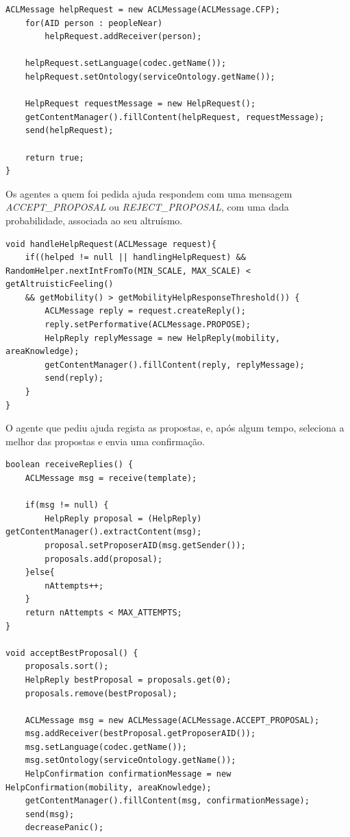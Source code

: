 \documentclass[12pt]{article}
\begin{document}
\begin{titlepage}
\begin{itemize}
\begin{lstlisting}[caption= Código \textit{Java}\ de envio de um pedido de ajuda.]
	ACLMessage helpRequest = new ACLMessage(ACLMessage.CFP);
	for(AID person : peopleNear)
		helpRequest.addReceiver(person);
	
	helpRequest.setLanguage(codec.getName());
	helpRequest.setOntology(serviceOntology.getName());
	
	HelpRequest requestMessage = new HelpRequest();
	getContentManager().fillContent(helpRequest, requestMessage);
	send(helpRequest);
	
	return true;
}
\end{lstlisting}

Os agentes a quem foi pedida ajuda respondem com uma mensagem \textit{ACCEPT\_PROPOSAL} ou \textit{REJECT\_PROPOSAL}, com uma dada probabilidade, associada ao seu altruísmo.

\begin{lstlisting}[caption= Código \textit{Java}\ da função responsável pela receção de pedidos de direções.]
void handleHelpRequest(ACLMessage request){
	if((helped != null || handlingHelpRequest) && RandomHelper.nextIntFromTo(MIN_SCALE, MAX_SCALE) < getAltruisticFeeling() 
	&& getMobility() > getMobilityHelpResponseThreshold()) {
		ACLMessage reply = request.createReply();
		reply.setPerformative(ACLMessage.PROPOSE);			
		HelpReply replyMessage = new HelpReply(mobility, areaKnowledge);
		getContentManager().fillContent(reply, replyMessage);
		send(reply);
	}
}
\end{lstlisting}

O agente que pediu ajuda regista as propostas, e, após algum tempo, seleciona a melhor das propostas e envia uma confirmação.

\begin{lstlisting}[caption= Código \textit{Java}\ das funções responsáveis pela receção e confirmação de prospostas de ajuda.]
boolean receiveReplies() {
	ACLMessage msg = receive(template);
	
	if(msg != null) {
		HelpReply proposal = (HelpReply) getContentManager().extractContent(msg);
		proposal.setProposerAID(msg.getSender());
		proposals.add(proposal);
	}else{
		nAttempts++;
	}
	return nAttempts < MAX_ATTEMPTS;
}

void acceptBestProposal() {
	proposals.sort();
	HelpReply bestProposal = proposals.get(0);
	proposals.remove(bestProposal);
	
	ACLMessage msg = new ACLMessage(ACLMessage.ACCEPT_PROPOSAL);
	msg.addReceiver(bestProposal.getProposerAID());
	msg.setLanguage(codec.getName());
	msg.setOntology(serviceOntology.getName());
	HelpConfirmation confirmationMessage = new HelpConfirmation(mobility, areaKnowledge);
	getContentManager().fillContent(msg, confirmationMessage);
	send(msg);
	decreasePanic();
	

\end{lstlisting}
\end{itemize}
\end{titlepage}
\end{document}
